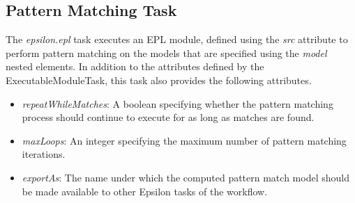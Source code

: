 \subsection{Pattern Matching Task}

The \emph{epsilon.epl} task executes an EPL module, defined using the \emph{src} attribute to perform pattern matching on the models that are specified using the \emph{model} nested elements. In addition to the attributes defined by the ExecutableModuleTask, this task also provides the following attributes.

\begin{itemize}
  \item \emph{repeatWhileMatches}: A boolean specifying whether the pattern matching process should continue to execute for as long as matches are found.
  \item \emph{maxLoops}: An integer specifying the maximum number of pattern matching iterations.
  \item \emph{exportAs}: The name under which the computed pattern match model should be made available to other Epsilon tasks of the workflow.
\end{itemize}
